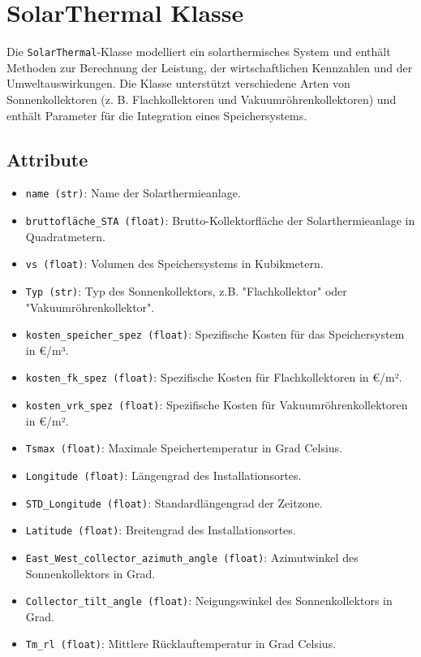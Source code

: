 \section{SolarThermal Klasse}
Die \texttt{SolarThermal}-Klasse modelliert ein solarthermisches System und enthält Methoden zur Berechnung der Leistung, der wirtschaftlichen Kennzahlen und der Umweltauswirkungen. Die Klasse unterstützt verschiedene Arten von Sonnenkollektoren (z. B. Flachkollektoren und Vakuumröhrenkollektoren) und enthält Parameter für die Integration eines Speichersystems.

\subsection{Attribute}
\begin{itemize}
    \item \texttt{name (str)}: Name der Solarthermieanlage.
    \item \texttt{bruttofläche\_STA (float)}: Brutto-Kollektorfläche der Solarthermieanlage in Quadratmetern.
    \item \texttt{vs (float)}: Volumen des Speichersystems in Kubikmetern.
    \item \texttt{Typ (str)}: Typ des Sonnenkollektors, z.B. "Flachkollektor" oder "Vakuumröhrenkollektor".
    \item \texttt{kosten\_speicher\_spez (float)}: Spezifische Kosten für das Speichersystem in €/m³.
    \item \texttt{kosten\_fk\_spez (float)}: Spezifische Kosten für Flachkollektoren in €/m².
    \item \texttt{kosten\_vrk\_spez (float)}: Spezifische Kosten für Vakuumröhrenkollektoren in €/m².
    \item \texttt{Tsmax (float)}: Maximale Speichertemperatur in Grad Celsius.
    \item \texttt{Longitude (float)}: Längengrad des Installationsortes.
    \item \texttt{STD\_Longitude (float)}: Standardlängengrad der Zeitzone.
    \item \texttt{Latitude (float)}: Breitengrad des Installationsortes.
    \item \texttt{East\_West\_collector\_azimuth\_angle (float)}: Azimutwinkel des Sonnenkollektors in Grad.
    \item \texttt{Collector\_tilt\_angle (float)}: Neigungswinkel des Sonnenkollektors in Grad.
    \item \texttt{Tm\_rl (float)}: Mittlere Rücklauftemperatur in Grad Celsius.

\end{itemize}
